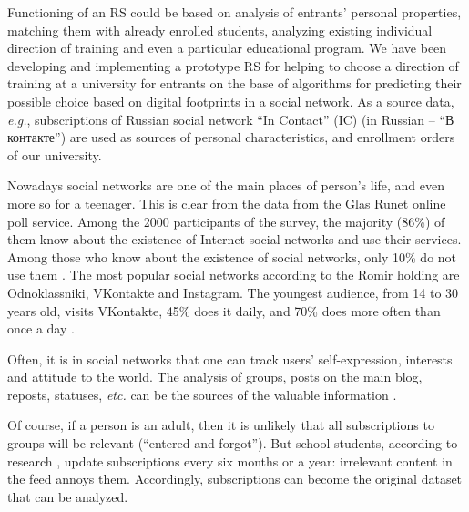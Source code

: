 \documentclass[conference,a4]{IEEEtran}
\begin{document}
Functioning of an RS could be based on analysis of entrants' personal properties, matching them with already enrolled students, analyzing existing individual direction of training and even a particular educational program.  We have been developing and implementing a prototype RS for helping to choose a direction of training at a university for entrants on the base of algorithms for predicting their possible choice based on digital footprints in a social network. As a source data, \emph{e.g.}, subscriptions of Russian social network ``In Contact'' (IC) (in Russian -- ``В контакте'') are used as sources of personal characteristics, and enrollment orders of our university.  %

Nowadays social networks are one of the main places of person's life, and even more so for a teenager.  This is clear from the data from the Glas Runet online poll service.  Among the 2000 participants of the survey, the majority (86\%) of them know about the existence of Internet social networks and use their services.  Among those who know about the existence of social networks, only 10\% do not use them \cite{c2}.
The most popular social networks according to the Romir holding are Odnoklassniki, VKontakte and Instagram.  The youngest audience, from 14 to 30 years old, visits VKontakte, 45\% does it daily, and 70\% does more often than once a day \cite{c6}.

Often, it is in social networks that one can track users' self-expression, interests and attitude to the world. The analysis of groups, posts on the main blog, reposts, statuses, \emph{etc.} can be the sources of the valuable information \cite{c7}.

Of course, if a person is an adult, then it is unlikely that all subscriptions to groups will be relevant (``entered and forgot'').  But school students, according to research \cite{c11}, update subscriptions every six months or a year: irrelevant content in the feed annoys them.  Accordingly, subscriptions can become the original dataset that can be analyzed.
\end{document}
